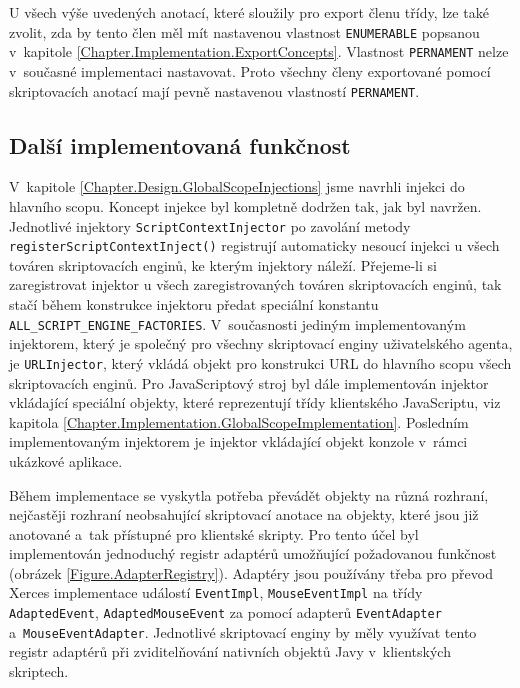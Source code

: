 U všech výše uvedených anotací, které sloužily pro export členu třídy, lze také zvolit, zda by tento člen měl mít nastavenou vlastnost \texttt{ENUMERABLE} popsanou v~kapitole \ref{Chapter.Implementation.ExportConcepts}. Vlastnost \texttt{PERNAMENT} nelze v~současné implementaci nastavovat. Proto všechny členy exportované pomocí skriptovacích anotací mají pevně nastavenou vlastností \texttt{PERNAMENT}.

\subsection{Další implementovaná funkčnost}
\label{Chapter.Implementation.OtherFunctionality}

V~kapitole \ref{Chapter.Design.GlobalScopeInjections} jsme navrhli injekci do hlavního scopu. Koncept injekce byl kompletně dodržen tak, jak byl navržen. Jednotlivé injektory \texttt{ScriptContextInjector} po zavolání metody \texttt{registerScriptContextInject()} registrují automaticky nesoucí injekci u všech továren skriptovacích enginů, ke kterým injektory náleží. Přejeme-li si zaregistrovat injektor u všech zaregistrovaných továren skriptovacích enginů, tak stačí během konstrukce injektoru předat speciální konstantu \texttt{ALL\_SCRIPT\_ENGINE\_FACTORIES}. V~současnosti jediným implementovaným injektorem, který je společný pro všechny skriptovací enginy uživatelského agenta, je \texttt{URLInjector}, který vkládá objekt pro konstrukci URL do hlavního scopu všech skriptovacích enginů. Pro JavaScriptový stroj byl dále implementován injektor vkládající speciální objekty, které reprezentují třídy klientského JavaScriptu, viz kapitola \ref{Chapter.Implementation.GlobalScopeImplementation}. Posledním implementovaným injektorem je injektor vkládající objekt konzole v~rámci ukázkové aplikace. 

Během implementace se vyskytla potřeba převádět objekty na různá rozhraní, nejčastěji rozhraní neobsahující skriptovací anotace na objekty, které jsou již anotované a~tak přístupné pro klientské skripty. Pro tento účel byl implementován jednoduchý registr adaptérů umožňující požadovanou funkčnost (obrázek \ref{Figure.AdapterRegistry}). Adaptéry jsou používány třeba pro převod Xerces implementace událostí \texttt{EventImpl}, \texttt{MouseEventImpl} na třídy \texttt{AdaptedEvent}, \texttt{AdaptedMouseEvent} za pomocí adapterů \texttt{EventAdapter} a~\texttt{MouseEventAdapter}. Jednotlivé skriptovací enginy by měly využívat tento registr adaptérů při zviditelňování nativních objektů Javy v~klientských skriptech.

